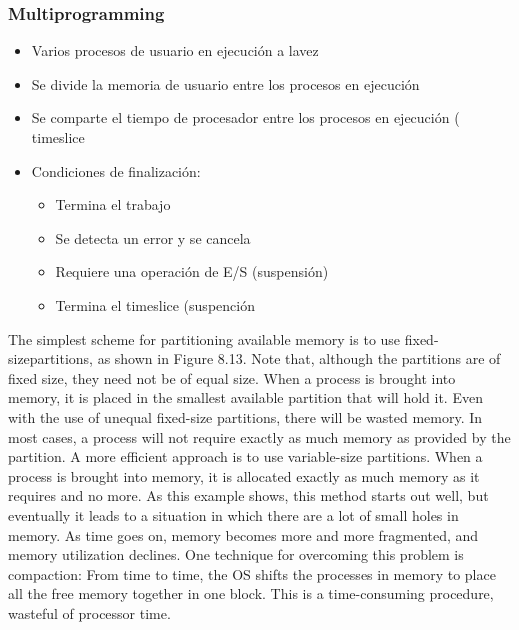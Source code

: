 \subsubsection{Multiprogramming}
\begin{itemize}
\item Varios procesos de usuario en ejecución a lavez
\item Se divide la memoria de usuario entre los procesos en ejecución
\item Se comparte el tiempo de procesador entre los procesos en ejecución ( timeslice
\item Condiciones de finalización:
	\begin{itemize}
	\item Termina el trabajo
	\item Se detecta un error y se cancela
	\item Requiere una operación de E/S (suspensión)
	\item Termina el timeslice (suspención
	\end{itemize}
\end{itemize}

The simplest scheme for partitioning available memory is to use fixed-
sizepartitions, as shown in Figure 8.13. Note that, although the partitions are of fixed size, they need not be of equal size. When a process is brought into memory, it is placed in the
smallest available partition that will hold it.
Even with the use of unequal fixed-size partitions, there will be wasted memory.
In most cases, a process will not require exactly as much memory as provided by the partition.
A more efficient approach is to use variable-size partitions. When a process is
brought into memory, it is allocated exactly as much memory as it requires and no more.
As this example shows, this method starts out well, but eventually it leads to a
situation in which there are a lot of small holes in memory. As time goes on, memory
becomes more and more fragmented, and memory utilization declines. One
technique for overcoming this problem is compaction: From time to time, the OS
shifts the processes in memory to place all the free memory together in one block.
This is a time-consuming procedure, wasteful of processor time.


